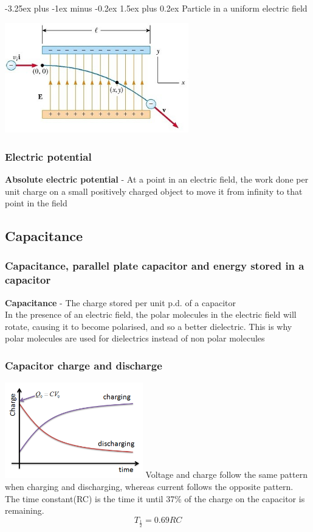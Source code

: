 \documentclass[12pt]{article}
\makeatletter
\renewcommand{\paragraph}{\@startsection{paragraph}{4}{0ex}%
    {-3.25ex plus -1ex minus -0.2ex}%
    {1.5ex plus 0.2ex}%
    {\normalfont\normalsize\bfseries}}
\makeatother
\begin{document}
\paragraph{Particle in a uniform electric field}
\begin{center}
\includegraphics[width=8cm]{particle.jpg}
\end{center}
\subsubsection{Electric potential}
\textbf{Absolute electric potential} - At a point in an electric field, the work done per unit charge on a small positively charged object to move it from infinity to that point in the field
\subsection{Capacitance}
\subsubsection{Capacitance, parallel plate capacitor and energy stored in a capacitor}
\textbf{Capacitance} - The charge stored per unit p.d. of a capacitor\\
In the presence of an electric field, the polar molecules in the electric field will rotate, causing it to become polarised, and so a better dielectric. This is why polar molecules are used for dielectrics instead of non polar molecules
\subsubsection{Capacitor charge and discharge}
\includegraphics[width=6cm]{charge.png}
Voltage and charge follow the same pattern when charging and discharging, whereas current follows the opposite pattern.\\
The time constant(RC) is the time it until 37\% of the charge on the capacitor is remaining.
$$T_{\frac{1}{2}}=0.69RC$$
\end{document}
